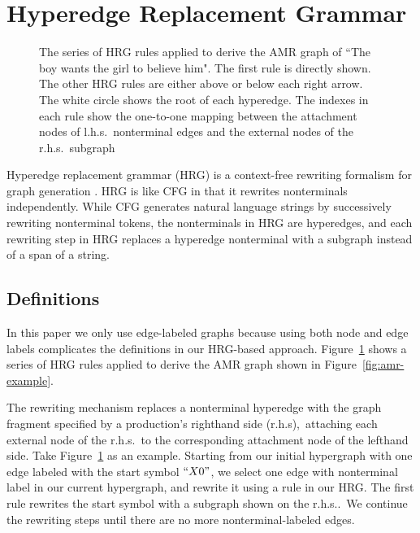 \section{Hyperedge Replacement Grammar}
\begin{figure}
\begin{center}
\caption{The series of HRG rules applied to derive the AMR graph of ``The boy wants the girl to believe him". The first rule is directly shown. The other HRG rules
are either above or below each right arrow. The white circle shows the root of each hyperedge. The indexes in each rule show the one-to-one mapping
between the attachment nodes of l.h.s.\ nonterminal edges and the external nodes of the r.h.s.\ subgraph}
\label{fig:hrg-example}
\vspace{-1em}
\end{center}
\end{figure}
Hyperedge replacement grammar (HRG) is a context-free rewriting formalism for graph generation \cite{drewes+al:1997}. 
HRG is like CFG in that it rewrites nonterminals independently.
While CFG generates natural language strings by successively rewriting nonterminal tokens, the nonterminals in 
HRG are hyperedges, and each rewriting step in HRG replaces a hyperedge nonterminal with a subgraph instead of a span of a string.
\subsection{Definitions}
In this paper we only use edge-labeled graphs
because using both node and edge labels complicates the definitions in our HRG-based approach. Figure~\ref{fig:hrg-example} 
shows a series of HRG rules applied to derive the AMR graph shown in Figure~\ref{fig:amr-example}.


The rewriting mechanism replaces a nonterminal 
hyperedge with the graph fragment specified by a production's
righthand side (r.h.s),\ attaching each external node of the 
r.h.s.\ to the corresponding attachment node of the lefthand side.
Take Figure~\ref{fig:hrg-example} as an example. 
Starting from our initial hypergraph with one edge 
labeled with the start symbol $``X0"$, we select one edge with nonterminal label in our current hypergraph, 
and rewrite it using a rule in our HRG\@. The first rule rewrites
the start symbol with a subgraph shown on the r.h.s..\ We continue the rewriting steps 
until there are no more nonterminal-labeled edges. 


